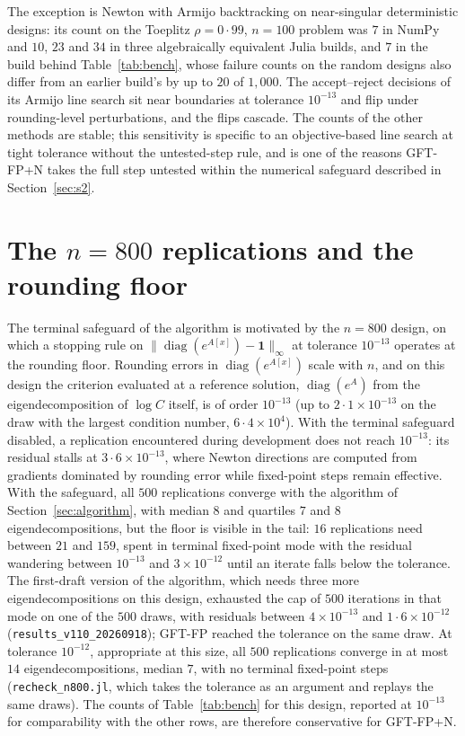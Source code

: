 \documentclass[11pt]{article}
\newcommand{\diag}{\operatorname{diag}}
\newcommand{\one}{\mathbf{1}}
\begin{document}
The exception is Newton with Armijo backtracking on near-singular
deterministic designs: its count on the Toeplitz $\rho=0{\cdot}99$,
$n=100$ problem was $7$ in NumPy and $10$, $23$ and $34$ in three
algebraically equivalent Julia builds, and $7$ in the build behind
Table~\ref{tab:bench}, whose failure counts on the random designs also
differ from an earlier build's by up to $20$ of $1{,}000$. The
accept--reject decisions of its Armijo line search sit near boundaries
at tolerance $10^{-13}$ and flip under rounding-level perturbations,
and the flips cascade. The counts of the other methods are stable;
this sensitivity is specific to an objective-based line search at
tight tolerance without the untested-step rule, and is one of the
reasons GFT-FP+N takes the full step untested within the numerical
safeguard described in Section~\ref{sec:s2}.

\section{The $n=800$ replications and the rounding floor}\label{sec:s6}

The terminal safeguard of the algorithm is motivated by the $n=800$
design, on which a stopping rule on
$\|\diag(e^{A[x]})-\one\|_{\infty}$ at tolerance $10^{-13}$ operates
at the rounding floor. Rounding errors in $\diag(e^{A[x]})$ scale with
$n$, and on this design the criterion evaluated at a reference
solution, $\diag(e^{A})$ from the eigendecomposition of $\log C$
itself, is of order $10^{-13}$ (up to $2{\cdot}1\times10^{-13}$ on the
draw with the largest condition number, $6{\cdot}4\times10^{4}$). With
the terminal safeguard disabled, a replication encountered during
development does not reach $10^{-13}$: its residual stalls at
$3{\cdot}6\times10^{-13}$, where Newton directions are computed from
gradients dominated by rounding error while fixed-point steps remain
effective. With the safeguard, all $500$ replications converge with
the algorithm of Section~\ref{sec:algorithm}, with median $8$ and
quartiles $7$ and $8$ eigendecompositions, but the floor is visible in
the tail: $16$ replications need between $21$ and $159$, spent in
terminal fixed-point mode with the residual wandering between
$10^{-13}$ and $3\times10^{-12}$ until an iterate falls below the
tolerance. The first-draft version of the algorithm, which needs
three more eigendecompositions on this design, exhausted the cap of
$500$ iterations in that mode on one of the $500$ draws, with
residuals between $4\times10^{-13}$ and $1{\cdot}6\times10^{-12}$
(\texttt{results\_v110\_20260918}); GFT-FP reached the tolerance on
the same draw. At tolerance $10^{-12}$, appropriate at this size, all
$500$ replications converge in at most $14$ eigendecompositions,
median $7$, with no terminal fixed-point steps
(\texttt{recheck\_n800.jl}, which takes the tolerance as an argument
and replays the same draws). The counts of Table~\ref{tab:bench} for
this design, reported at $10^{-13}$ for comparability with the other
rows, are therefore conservative for GFT-FP+N.
\end{document}
